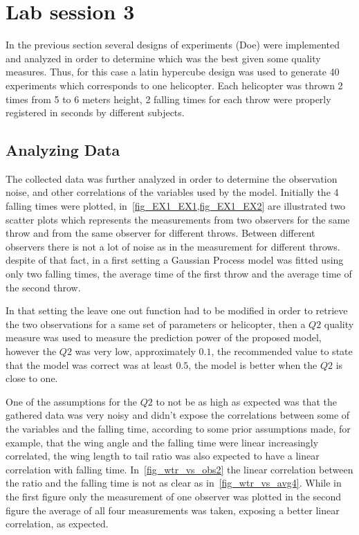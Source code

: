 \section{Lab session 3}

In the previous section several designs of experiments (Doe) were implemented
and analyzed in order to determine which was the best given some quality
measures. Thus, for this case a latin hypercube design was used to generate 40
experiments which corresponds to one helicopter. Each helicopter was thrown 2
times from 5 to 6 meters height, 2 falling times for each throw were properly
registered in seconds by different subjects.

\subsection{Analyzing Data}

The collected data was further analyzed in order to determine the observation
noise, and other correlations of the variables used by the model. Initially the
4 falling times were plotted, in~\cref{fig_EX1_EX1,fig_EX1_EX2} are illustrated
two scatter plots which represents the measurements from two observers for the
same throw and from the same observer for different throws. Between different
observers there is not a lot of noise as in the measurement for different
throws. despite of that fact, in a first setting a Gaussian Process model was
fitted using only two falling times, the average time of the first throw and the
average time of the second throw.

In that setting the leave one out function had to be modified in order to
retrieve the two observations for a same set of parameters or helicopter, then a
$Q2$ quality measure was used to measure the prediction power of the proposed
model, however the $Q2$ was very low, approximately $0.1$, the recommended value
to state that the model was correct was at least $0.5$, the model is better when
the $Q2$ is close to one.

One of the assumptions for the $Q2$ to not be as high as expected was that the
gathered data was very noisy and didn't expose the correlations between some of
the variables and the falling time, according to some prior assumptions made,
for example, that the wing angle and the falling time were linear increasingly
correlated, the wing length to tail ratio was also expected to have a linear
correlation with falling time. In~\cref{fig_wtr_vs_obs2} the linear correlation
between the ratio and the falling time is not as clear as
in~\cref{fig_wtr_vs_avg4}. While in the first figure only the measurement of one
observer was plotted in the second figure the average of all four measurements
was taken, exposing a better linear correlation, as expected.

